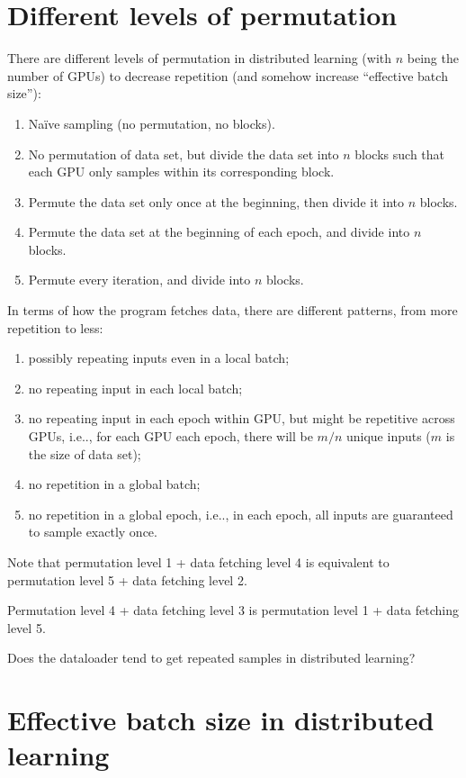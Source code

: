 \documentclass[12pt, letterpaper]{article}
\makeatletter
\newcommand\ie{i.e\@ifnextchar.{}{.\@}}
\theoremstyle{definition}
\theoremstyle{remark}
\makeatother
\begin{document}
	\section{Different levels of permutation}
	There are different levels of permutation in distributed learning (with $n$ being the number of GPUs)
	to decrease repetition (and somehow increase ``effective batch size''):
	\begin{enumerate}
		\item Naïve sampling (no permutation, no blocks).
		\item No permutation of data set, but divide the data set into $n$ blocks
		such that each GPU only samples within its corresponding block.
		\item Permute the data set only once at the beginning, then divide it into $n$ blocks.
		\item Permute the data set at the beginning of each epoch, and divide into $n$ blocks.
		\item Permute every iteration, and divide into $n$ blocks.
	\end{enumerate}

	In terms of how the program fetches data, there are different patterns, from more repetition to less:
	\begin{enumerate}
		\item possibly repeating inputs even in a local batch;
		\item no repeating input in each local batch;
		\item no repeating input in each epoch within GPU, but might be repetitive across GPUs,
		\ie, for each GPU each epoch, there will be $m/n$ unique inputs ($m$ is the size of data set);
		\item no repetition in a global batch;
		\item no repetition in a global epoch, \ie, in each epoch, all inputs are guaranteed to
		sample exactly once.
	\end{enumerate}

	Note that permutation level 1 + data fetching level 4 is equivalent to permutation level 5 + data fetching level 2.
	
	Permutation level 4 + data fetching level 3 is permutation level 1 + data fetching level 5.

	
	Does the dataloader tend to get repeated samples in distributed learning?
	
	\section{Effective batch size in distributed learning}
	
\end{document}
